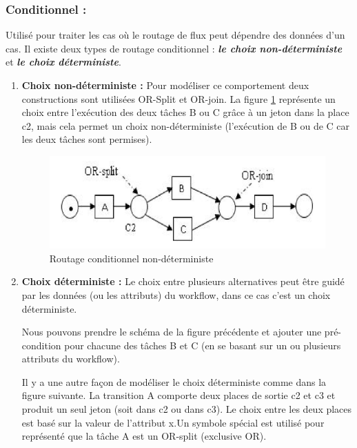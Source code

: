 \subsubsection{Conditionnel :}

Utilisé pour traiter les cas où le routage de flux peut dépendre des données d’un cas. Il existe deux types de routage conditionnel : \textit{\textbf{le choix non-déterministe}} et \textit{\textbf{le choix déterministe}}. 


\begin{enumerate}

\item \textbf{Choix non-déterministe :} Pour modéliser ce comportement deux constructions sont utilisées OR-Split et OR-join. La figure \ref{fig:wf005} représente un choix entre l’exécution des deux tâches B ou C grâce à un jeton dans la place c2, mais cela permet un choix non-déterministe (l’exécution de B ou de C car les deux tâches sont permises).



\begin{figure}[H]
	\centering
	\includegraphics[width=0.7\linewidth]{images/wf005}
	\caption{Routage conditionnel non-déterministe}
	\label{fig:wf005}
\end{figure}



\item \textbf{Choix déterministe : } Le choix entre plusieurs alternatives peut être guidé par les données (ou les attributs) du workflow, dans ce cas c’est un choix déterministe.

Nous pouvons prendre le schéma de la figure précédente et ajouter une pré-condition pour chacune des tâches B et C (en se basant sur un ou plusieurs attributs du workflow).

Il y a une autre façon de modéliser le choix déterministe comme dans la figure suivante. La transition A comporte deux places de sortie c2 et c3 et produit un seul jeton (soit dans c2 ou dans c3). Le choix entre les deux places est basé sur la valeur de l’attribut x.Un symbole spécial est utilisé pour représenté que la tâche A est un OR-split (exclusive OR).



\end{enumerate}
